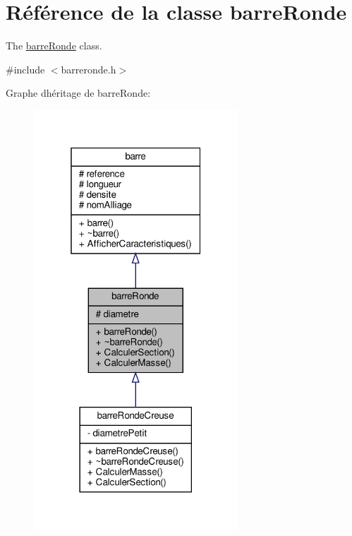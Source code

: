\hypertarget{classbarre_ronde}{}\section{Référence de la classe barre\+Ronde}
\label{classbarre_ronde}


The \hyperlink{classbarre_ronde}{barre\+Ronde} class.  




{\ttfamily \#include $<$barreronde.\+h$>$}



Graphe d\textquotesingle{}héritage de barre\+Ronde\+:
\nopagebreak
\begin{figure}[H]
\begin{center}
\leavevmode
\includegraphics[width=217pt]{classbarre_ronde__inherit__graph}
\end{center}
\end{figure}


